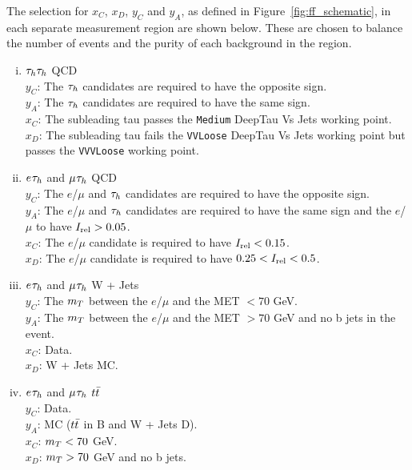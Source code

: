 The selection for $x_C$, $x_D$, $y_C$ and $y_A$, as defined in Figure~\ref{fig:ff_schematic}, in each separate measurement region are shown below.
These are chosen to balance the number of events and the purity of each background in the region.

\begin{enumerate}[i)]
   \item $\tau_{h}\tau_{h}$ QCD \\
     \indent $y_C$: The $\tau_{h}$ candidates are required to have the opposite sign. \\
     \indent $y_A$: The $\tau_{h}$ candidates are required to have the same sign. \\
     \indent $x_C$: The subleading tau passes the \texttt{Medium} DeepTau Vs Jets working point. \\
     \indent $x_D$: The subleading tau fails the \texttt{VVLoose} DeepTau Vs Jets working point but passes the \texttt{VVVLoose} working point.
  \item $e_{}\tau_{h}$ and $\mu_{}\tau_{h}$ QCD \\
    \indent $y_C$: The $e$/$\mu$ and $\tau_{h}$ candidates are required to have the opposite sign. \\
    \indent $y_A$: The $e$/$\mu$ and $\tau_{h}$ candidates are required to have the same sign and the $e$/$\mu$ to have $I_{\text{rel}}>0.05$. \\
    \indent $x_C$: The $e$/$\mu$ candidate is required to have $I_{\text{rel}}<0.15$. \\
    \indent $x_D$: The $e$/$\mu$ candidate is required to have $0.25<I_{\text{rel}}<0.5$.
  \item $e_{}\tau_{h}$ and $\mu_{}\tau_{h}$ W + Jets \\
    \indent $y_C$: The $m_{T}$ between the $e$/$\mu$ and the MET $< 70$ GeV. \\
    \indent $y_A$: The $m_{T}$ between the $e$/$\mu$ and the MET $> 70$ GeV and no b jets in the event. \\
    \indent $x_C$: Data. \\
    \indent $x_D$: W + Jets MC.
  \item $e_{}\tau_{h}$ and $\mu_{}\tau_{h}$ $t\bar{t}$ \\
    \indent $y_C$: Data. \\
    \indent $y_A$: MC ($t\bar{t}$ in B and W + Jets D). \\
    \indent $x_C$: $m_{T} < 70$ GeV. \\
    \indent $x_D$: $m_{T} > 70$ GeV and no b jets. \\
\end{enumerate}


